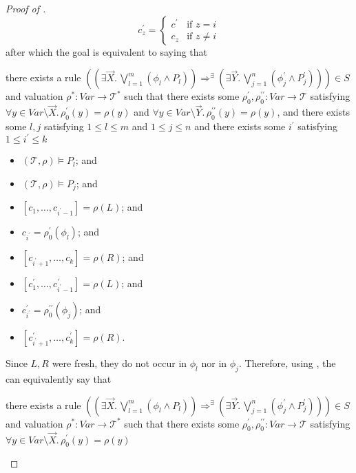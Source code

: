 \documentclass{article}
\newenvironment{proofenv}
  {
    \VerbatimEnvironment\begin{tcolorbox}[colback=black!0!white] %
  }
  {
   \end{tcolorbox}
  }
\begin{document}
\begin{proof}[Proof of ]
\begin{equation*}
c^\prime_{z} =
    \begin{cases}
        c^\prime & \text{if } z = i \\
        c_z & \text{if } z \not = i
    \end{cases}
\end{equation*}
after which the goal is equivalent to saying that
\begin{proofenv}
there exists a rule $((\exists \vec{X}.\, \bigvee_{l=1}^{m} (\phi_l \land P_l)) \Rightarrow^\exists (\exists \vec{Y}.\, \bigvee_{j=1}^{n} (\phi^\prime_j \land P^\prime_j))) \in S$
and valuation $\rho^* : \mathit{Var} \to \mathcal{T}^*$ such that
there exists some $\rho_0^\prime,\rho_0^{\prime\prime} : \mathit{Var} \to \mathcal{T}$
satisfying $\forall y \in \mathit{Var} \setminus \vec{X}.\, \rho_0^\prime(y) = \rho(y)$
and $\forall y \in \mathit{Var} \setminus \vec{Y}.\, \rho_0^{\prime\prime}(y) = \rho(y)$,
and there exists some $l,j$ satisfying $1 \leq l \leq m$ and $1 \leq j \leq n$
and there exists some $i^\prime$ satisfying $1 \leq i^\prime \leq k$
\begin{itemize}
    \item $(\mathcal{T}, \rho) \vDash P_l$; and
    \item $(\mathcal{T}, \rho) \vDash P_j$; and
    \item $[c_1,\ldots, c_{i^\prime-1}] = \rho(L)$; and
    \item $c_{i^\prime} = \rho_0^\prime(\phi_l)$; and
    \item $[c_{i^\prime+1},\ldots,c_k] = \rho(R)$; and
    \item $[c^\prime_1,\ldots, c^\prime_{i^\prime-1}] = \rho(L)$; and
    \item $c^\prime_{i^\prime} = \rho_0^{\prime\prime}(\phi_j)$; and
    \item $[c^\prime_{i^\prime+1},\ldots,c^\prime_k] = \rho(R)$.
\end{itemize}
\end{proofenv}
Since $L,R$ were fresh, they do not occur in $\phi_l$ nor in $\phi_j$.
Therefore, using , the can equivalently say that
\begin{proofenv}
there exists a rule $((\exists \vec{X}.\, \bigvee_{l=1}^{m} (\phi_l \land P_l)) \Rightarrow^\exists (\exists \vec{Y}.\, \bigvee_{j=1}^{n} (\phi^\prime_j \land P^\prime_j))) \in S$
and valuation $\rho^* : \mathit{Var} \to \mathcal{T}^*$ such that
there exists some $\rho_0^\prime,\rho_0^{\prime\prime} : \mathit{Var} \to \mathcal{T}$
satisfying $\forall y \in \mathit{Var} \setminus \vec{X}.\, \rho_0^\prime(y) = \rho(y)$

\end{proofenv}
\end{proof}
\end{document}
